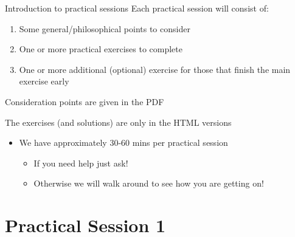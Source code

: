 \documentclass[
  ignorenonframetext,
  aspectratio=169,
]{beamer}
\providecommand{\tightlist}{%
  \setlength{\itemsep}{0pt}\setlength{\parskip}{0pt}}
\begin{document}
\begin{frame}{Introduction to practical sessions}
\protect\hypertarget{introduction-to-practical-sessions}{}
Each practical session will consist of:

\begin{enumerate}
\tightlist
\item
  Some general/philosophical points to consider
\item
  One or more practical exercises to complete
\item
  One or more additional (optional) exercise for those that finish the
  main exercise early
\end{enumerate}

\pause

Consideration points are given in the PDF

The exercises (and solutions) are only in the HTML versions
\end{frame}

\begin{frame}
\begin{itemize}
\tightlist
\item
  We have approximately 30-60 mins per practical session

  \begin{itemize}
  \tightlist
  \item
    If you need help just ask!
  \item
    Otherwise we will walk around to see how you are getting on!
  \end{itemize}
\end{itemize}
\end{frame}

\hypertarget{practical-session-1}{%
\section{Practical Session 1}\label{practical-session-1}}
\end{document}
